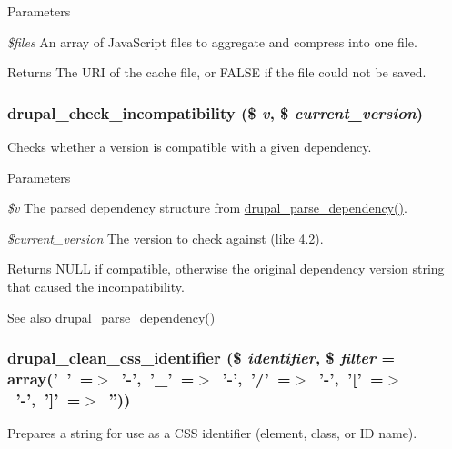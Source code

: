 \begin{DoxyParams}{Parameters}
\item[{\em \$files}]An array of JavaScript files to aggregate and compress into one file.\end{DoxyParams}
\begin{DoxyReturn}{Returns}
The URI of the cache file, or FALSE if the file could not be saved. 
\end{DoxyReturn}
\hypertarget{common_8inc_aa2a2d57500dc465711da5ac8e6afd406}{
\subsubsection[{drupal\_\-check\_\-incompatibility}]{\setlength{\rightskip}{0pt plus 5cm}drupal\_\-check\_\-incompatibility (\$ {\em v}, \/  \$ {\em current\_\-version})}}
\label{common_8inc_aa2a2d57500dc465711da5ac8e6afd406}
Checks whether a version is compatible with a given dependency.


\begin{DoxyParams}{Parameters}
\item[{\em \$v}]The parsed dependency structure from \hyperlink{common_8inc_a4e06efa27b45d3aa8670a8553d0194d6}{drupal\_\-parse\_\-dependency()}. \item[{\em \$current\_\-version}]The version to check against (like 4.2).\end{DoxyParams}
\begin{DoxyReturn}{Returns}
NULL if compatible, otherwise the original dependency version string that caused the incompatibility.
\end{DoxyReturn}
\begin{DoxySeeAlso}{See also}
\hyperlink{common_8inc_a4e06efa27b45d3aa8670a8553d0194d6}{drupal\_\-parse\_\-dependency()} 
\end{DoxySeeAlso}
\hypertarget{common_8inc_a71bc20ece521646a633b65868a441d26}{
\subsubsection[{drupal\_\-clean\_\-css\_\-identifier}]{\setlength{\rightskip}{0pt plus 5cm}drupal\_\-clean\_\-css\_\-identifier (\$ {\em identifier}, \/  \$ {\em filter} = {\ttfamily array('~'~=$>$~'-\/',~'\_\-'~=$>$~'-\/',~'/'~=$>$~'-\/',~'\mbox{[}'~=$>$~'-\/',~'\mbox{]}'~=$>$~'')})}}
\label{common_8inc_a71bc20ece521646a633b65868a441d26}
Prepares a string for use as a CSS identifier (element, class, or ID name).

